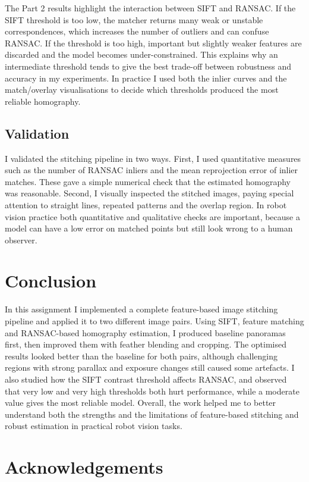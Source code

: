 \documentclass{Resources/UoBLab1}
\begin{document}
The Part 2 results highlight the interaction between SIFT and RANSAC.
If the SIFT threshold is too low, the matcher returns many weak or unstable correspondences, which increases the number of outliers and can confuse RANSAC.
If the threshold is too high, important but slightly weaker features are discarded and the model becomes under-constrained.
This explains why an intermediate threshold tends to give the best trade-off between robustness and accuracy in my experiments.
In practice I used both the inlier curves and the match/overlay visualisations to decide which thresholds produced the most reliable homography.

\subsection{Validation}

I validated the stitching pipeline in two ways.
First, I used quantitative measures such as the number of RANSAC inliers and the mean reprojection error of inlier matches.
These gave a simple numerical check that the estimated homography was reasonable.
Second, I visually inspected the stitched images, paying special attention to straight lines, repeated patterns and the overlap region.
In robot vision practice both quantitative and qualitative checks are important, because a model can have a low error on matched points but still look wrong to a human observer.

\section{Conclusion}

In this assignment I implemented a complete feature-based image stitching pipeline and applied it to two different image pairs.
Using SIFT, feature matching and RANSAC-based homography estimation, I produced baseline panoramas first, then improved them with feather blending and cropping.
The optimised results looked better than the baseline for both pairs, although challenging regions with strong parallax and exposure changes still caused some artefacts.
I also studied how the SIFT contrast threshold affects RANSAC, and observed that very low and very high thresholds both hurt performance, while a moderate value gives the most reliable model.
Overall, the work helped me to better understand both the strengths and the limitations of feature-based stitching and robust estimation in practical robot vision tasks.

\section*{Acknowledgements}
\end{document}
